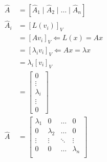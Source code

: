 \documentclass{article}
\theoremstyle{definition} %
\begin{document}
\begin{align*}
    \hat A &= [\hat A_1 \mid \hat A_2 \mid \dots \mid \hat A_n]\\
    \hat A_i &= [L(v_i)]_V\\
    &= [Av_i]_V \Leftarrow L(x) = Ax\\
    &= [\lambda_i v_i]_V \Leftarrow Ax = \lambda x\\
    &= \lambda_i[v_i]_V\\
    &= 
    \begin{bmatrix}
        0 \\ \vdots \\ \lambda_i \\ \vdots \\ 0
    \end{bmatrix}
    \\
    \hat A &= 
    \begin{bmatrix}
        \lambda_1 & 0 & \dots & 0\\
        0 & \lambda_2 & \dots & 0 \\
        \vdots & \vdots & \ddots& \vdots\\
        0 & 0 & \dots & \lambda_n\\
    \end{bmatrix}
\end{align*}
\end{document}
